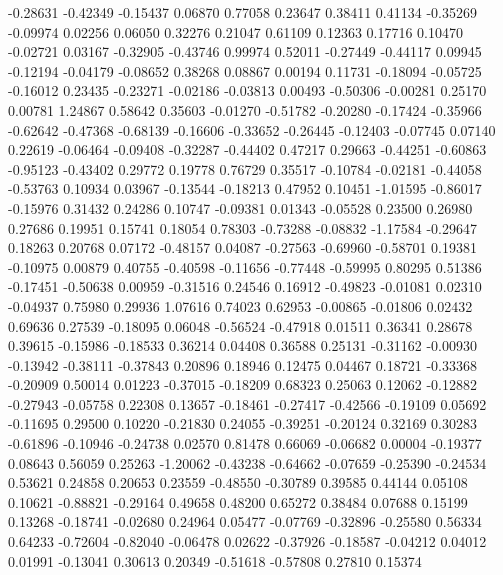   -0.28631 -0.42349
  -0.15437  0.06870
   0.77058  0.23647
   0.38411  0.41134
  -0.35269 -0.09974
   0.02256  0.06050
   0.32276  0.21047
   0.61109  0.12363
   0.17716  0.10470
  -0.02721  0.03167
  -0.32905 -0.43746
   0.99974  0.52011
  -0.27449 -0.44117
   0.09945 -0.12194
  -0.04179 -0.08652
   0.38268  0.08867
   0.00194  0.11731
  -0.18094 -0.05725
  -0.16012  0.23435
  -0.23271 -0.02186
  -0.03813  0.00493
  -0.50306 -0.00281
   0.25170  0.00781
   1.24867  0.58642
   0.35603 -0.01270
  -0.51782 -0.20280
  -0.17424 -0.35966
  -0.62642 -0.47368
  -0.68139 -0.16606
  -0.33652 -0.26445
  -0.12403 -0.07745
   0.07140  0.22619
  -0.06464 -0.09408
  -0.32287 -0.44402
   0.47217  0.29663
  -0.44251 -0.60863
  -0.95123 -0.43402
   0.29772  0.19778
   0.76729  0.35517
  -0.10784 -0.02181
  -0.44058 -0.53763
   0.10934  0.03967
  -0.13544 -0.18213
   0.47952  0.10451
  -1.01595 -0.86017
  -0.15976  0.31432
   0.24286  0.10747
  -0.09381  0.01343
  -0.05528  0.23500
   0.26980  0.27686
   0.19951  0.15741
   0.18054  0.78303
  -0.73288 -0.08832
  -1.17584 -0.29647
   0.18263  0.20768
   0.07172 -0.48157
   0.04087 -0.27563
  -0.69960 -0.58701
   0.19381 -0.10975
   0.00879  0.40755
  -0.40598 -0.11656
  -0.77448 -0.59995
   0.80295  0.51386
  -0.17451 -0.50638
   0.00959 -0.31516
   0.24546  0.16912
  -0.49823 -0.01081
   0.02310 -0.04937
   0.75980  0.29936
   1.07616  0.74023
   0.62953 -0.00865
  -0.01806  0.02432
   0.69636  0.27539
  -0.18095  0.06048
  -0.56524 -0.47918
   0.01511  0.36341
   0.28678  0.39615
  -0.15986 -0.18533
   0.36214  0.04408
   0.36588  0.25131
  -0.31162 -0.00930
  -0.13942 -0.38111
  -0.37843  0.20896
   0.18946  0.12475
   0.04467  0.18721
  -0.33368 -0.20909
   0.50014  0.01223
  -0.37015 -0.18209
   0.68323  0.25063
   0.12062 -0.12882
  -0.27943 -0.05758
   0.22308  0.13657
  -0.18461 -0.27417
  -0.42566 -0.19109
   0.05692 -0.11695
   0.29500  0.10220
  -0.21830  0.24055
  -0.39251 -0.20124
   0.32169  0.30283
  -0.61896 -0.10946
  -0.24738  0.02570
   0.81478  0.66069
  -0.06682  0.00004
  -0.19377  0.08643
   0.56059  0.25263
  -1.20062 -0.43238
  -0.64662 -0.07659
  -0.25390 -0.24534
   0.53621  0.24858
   0.20653  0.23559
  -0.48550 -0.30789
   0.39585  0.44144
   0.05108  0.10621
  -0.88821 -0.29164
   0.49658  0.48200
   0.65272  0.38484
   0.07688  0.15199
   0.13268 -0.18741
  -0.02680  0.24964
   0.05477 -0.07769
  -0.32896 -0.25580
   0.56334  0.64233
  -0.72604 -0.82040
  -0.06478  0.02622
  -0.37926 -0.18587
  -0.04212  0.04012
   0.01991 -0.13041
   0.30613  0.20349
  -0.51618 -0.57808
   0.27810  0.15374
